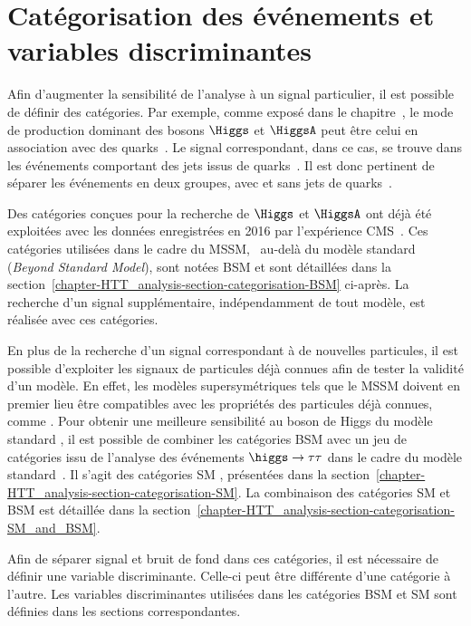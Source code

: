 \section{Catégorisation des événements et variables discriminantes}\label{chapter-HTT_analysis-section-categorisation}
Afin d'augmenter la sensibilité de l'analyse à un signal particulier, il est possible de définir des catégories.
Par exemple, comme exposé dans le chapitre~, le mode de production dominant des bosons $\Higgs$ et $\HiggsA$ peut être celui en association avec des quarks~\quarkb.
Le signal correspondant, dans ce cas, se trouve dans les événements comportant des jets issus de quarks~\quarkb.
Il est donc pertinent de séparer les événements en deux groupes, avec et sans jets de quarks~\quarkb.
\par
Des catégories conçues pour la recherche de $\Higgs$ et $\HiggsA$ ont déjà été exploitées avec les données enregistrées en 2016 par l'expérience CMS~\cite{CMS-PAS-HIG-17-020}.
Ces catégories utilisées dans le cadre du MSSM, \ie\ au-delà du modèle standard (\emph{Beyond Standard Model}), sont notées \og BSM \fg{} et sont détaillées dans la section~\ref{chapter-HTT_analysis-section-categorisation-BSM} ci-après.
La recherche d'un signal supplémentaire, indépendamment de tout modèle, est réalisée avec ces catégories.
\par
En plus de la recherche d'un signal correspondant à de nouvelles particules, il est possible d'exploiter les signaux de particules déjà connues afin de tester la validité d'un modèle.
En effet, les modèles supersymétriques tels que le MSSM doivent en premier lieu être compatibles avec les propriétés des particules déjà connues, comme \higgs.
Pour obtenir une meilleure sensibilité au boson de Higgs du modèle standard \higgs, il est possible de combiner les catégories BSM avec un jeu de catégories issu de l'analyse des événements $\higgs\to\tau\tau$ dans le cadre du modèle standard~\cite{CMS-PAS-HIG-19-010,CMS-NOTE-2019-177,CMS-NOTE-2019-178}.
Il s'agit des catégories \og SM \fg, présentées dans la section~\ref{chapter-HTT_analysis-section-categorisation-SM}.
La combinaison des catégories SM et BSM est détaillée dans la section~\ref{chapter-HTT_analysis-section-categorisation-SM_and_BSM}.
\par
Afin de séparer signal et bruit de fond dans ces catégories, il est nécessaire de définir une variable discriminante.
Celle-ci peut être différente d'une catégorie à l'autre.
Les variables discriminantes utilisées dans les catégories BSM et SM sont définies dans les sections correspondantes.



